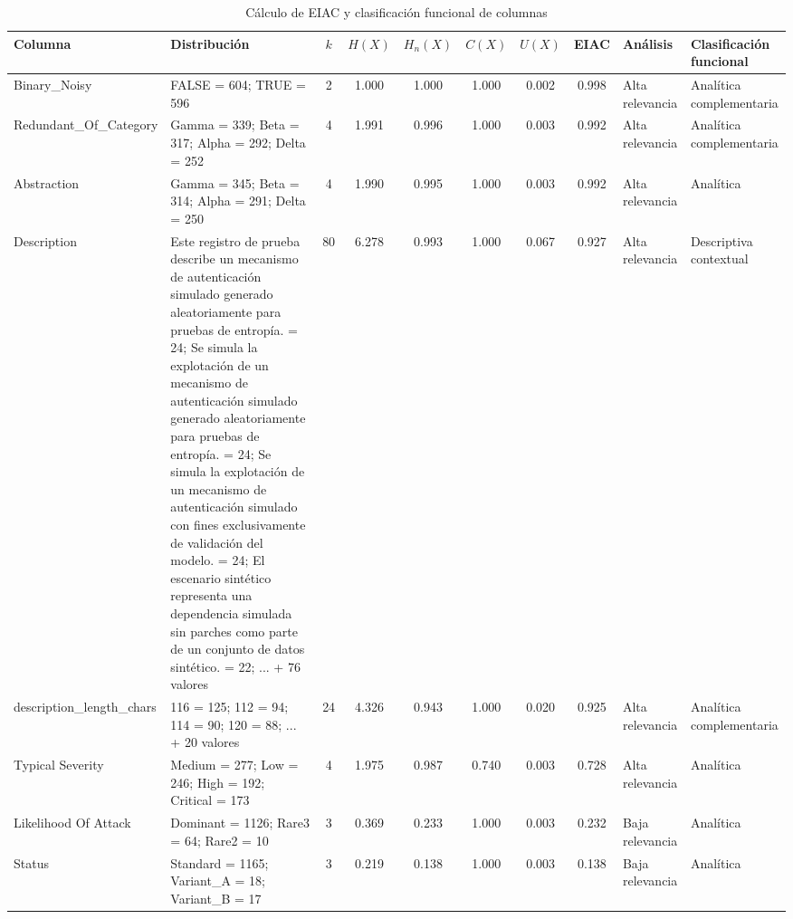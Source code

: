 \begin{table}[h]
\centering
\caption{Cálculo de EIAC y clasificación funcional de columnas}
\label{tab:calculo-eiac-columnas-20260624_102946}
\scriptsize
\begin{tabular}{|p{2.1cm}|p{3.0cm}|c|c|c|c|c|c|p{2.5cm}|p{2.8cm}|}
\hline
\textbf{Columna} & \textbf{Distribución} & \textbf{\(k\)} & \textbf{\(H(X)\)} & \textbf{\(H_n(X)\)} & \textbf{\(C(X)\)} & \textbf{\(U(X)\)} & \textbf{EIAC} & \textbf{Análisis} & \textbf{Clasificación funcional} \\
\hline
Binary\_Noisy & FALSE = 604; TRUE = 596 & 2 & 1.000 & 1.000 & 1.000 & 0.002 & 0.998 & Alta relevancia & Analítica complementaria \\
\hline
Redundant\_Of\_Category & Gamma = 339; Beta = 317; Alpha = 292; Delta = 252 & 4 & 1.991 & 0.996 & 1.000 & 0.003 & 0.992 & Alta relevancia & Analítica complementaria \\
\hline
Abstraction & Gamma = 345; Beta = 314; Alpha = 291; Delta = 250 & 4 & 1.990 & 0.995 & 1.000 & 0.003 & 0.992 & Alta relevancia & Analítica \\
\hline
Description & Este registro de prueba describe un mecanismo de autenticación simulado generado aleatoriamente para pruebas de entropía. = 24; Se simula la explotación de un mecanismo de autenticación simulado generado aleatoriamente para pruebas de entropía. = 24; Se simula la explotación de un mecanismo de autenticación simulado con fines exclusivamente de validación del modelo. = 24; El escenario sintético representa una dependencia simulada sin parches como parte de un conjunto de datos sintético. = 22; ... + 76 valores & 80 & 6.278 & 0.993 & 1.000 & 0.067 & 0.927 & Alta relevancia & Descriptiva contextual \\
\hline
description\_length\_chars & 116 = 125; 112 = 94; 114 = 90; 120 = 88; ... + 20 valores & 24 & 4.326 & 0.943 & 1.000 & 0.020 & 0.925 & Alta relevancia & Analítica complementaria \\
\hline
Typical Severity & Medium = 277; Low = 246; High = 192; Critical = 173 & 4 & 1.975 & 0.987 & 0.740 & 0.003 & 0.728 & Alta relevancia & Analítica \\
\hline
Likelihood Of Attack & Dominant = 1126; Rare3 = 64; Rare2 = 10 & 3 & 0.369 & 0.233 & 1.000 & 0.003 & 0.232 & Baja relevancia & Analítica \\
\hline
Status & Standard = 1165; Variant\_A = 18; Variant\_B = 17 & 3 & 0.219 & 0.138 & 1.000 & 0.003 & 0.138 & Baja relevancia & Analítica \\

\end{tabular}
\end{table}
